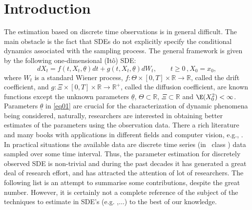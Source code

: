 \section{Introduction}

The estimation based on discrete time observations is in general difficult. The main obstacle is the fact that SDEs do not explicitly specify the conditional dynamics associated with the sampling process. The general framework is given by the following one-dimensional (It\^{o}) SDE:
\begin{equation}\label{eq01}
  dX_{t}= f(t,X_{t},\underline{\theta}) dt + g(t,X_{t},\underline{\theta}) dW_{t}, \quad \quad t \geq 0 \, , X_{0} = x_{0},
\end{equation}
where ${W}_{t}$ is a standard Wiener process, $f:\Theta \times [0,T] \times \mathbb{R} \rightarrow \mathbb{R}$, called the drift coefficient, and $g:\Xi \times [ 0 , T ] \times \mathbb{R} \rightarrow \mathbb{R}^{+}$, called the diffusion coefficient, are known functions except the unknown parameters $\underline{\theta}$, $\Theta \subset \mathbb{R}$, $\Xi \subset \mathbb{R}$ and $\E(X_{0}^{2}) < \infty$. Parameters $\underline{\theta}$ in \eqref{eq01} are crucial for the characterization of dynamic phenomena being considered, naturally, researchers are interested in obtaining better estimates of the parameters using the observation data. There a rich literature and many books with applications in different fields and computer vision, e.g., \cite{Prakasa1999,Sorensen2000,Kutoyants2004,Stefano2008,Stefano2011}. In practical situations the available data are discrete time series (in \R~class ) data sampled over some time interval. Thus, the parameter estimation for discretely observed SDE is non-trivial and during the past decades it has generated a great deal of research effort, and has attracted the attention of lot of
researchers. The following list is an attempt to summarise some contributions, despite the great number. However, it is certainly not a complete reference of the subject of the techniques to estimate in SDE's (e.g. \cite{DacunhaandFlorens1986,Dohnal1987,Florens1989,Genon1990,Ozaki1992,Yoshida1992,Pedersen1995,Kloedenetall1996,Kessler1997,GallantandLong1997,ShojiandOzaki1997,ShojiandOzaki1998,HurnandLindsay1999,Florens1999,AitSahalia1999,AitSahalia2002,Nicolau2002,Nicolau2004,Sorensen2000,Sorensen2002,Sorensen2004,Hurnetall2003,AlcockandBurrage2004,OgiharaandYoshida2011,UchidaandYoshida2012,BrousteandStefano2013},$\dots$)
to the best of our knowledge.


